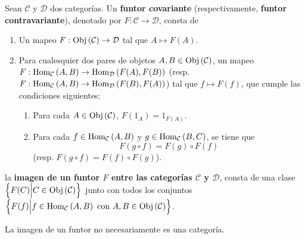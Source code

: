 \documentclass[12pt]{report}
\theoremstyle{largebreak}
\newcommand\cf[3]{\ensuremath{#1:#2\rightarrow#3}}
\newcommand{\Obj}[1]{\ensuremath{\textup{Obj}\left(#1\right)}}
\newcommand{\Hom}[3]{\ensuremath{\textup{Hom}_{#1}\left(#2,#3\right)}}
\begin{document}
    \begin{mydef}
        Sean $\mathcal{C}$ y $\mathcal{D}$ dos categorías. Un \textbf{funtor covariante} (respectivamente, \textbf{funtor contravariante}), denotado por $\cf{F}{\mathcal{C}}{\mathcal{D}}$, consta de
        \begin{enumerate}
            \item Un mapeo $\cf{F}{\Obj{\mathcal{C}}}{\mathcal{D}}$ tal que $A\mapsto F(A)$.
            \item Para cualesquier dos pares de objetos $A,B\in\Obj{\mathcal{C}}$, un mapeo $\cf{F}{\Hom{\mathcal{C}}{A}{B}}{\Hom{\mathcal{D}}{F(A)}{F(B)}}$ (resp. $\cf{F}{\Hom{\mathcal{C}}{A}{B}}{\Hom{\mathcal{D}}{F(B)}{F(A)}}$) tal que $f\mapsto F(f)$, que cumple las condiciones siguientes:
            \begin{enumerate}
                \item Para cada $A\in\Obj{\mathcal{C}}$, $F(1_A)=1_{F(A)}$.
                \item Para cada $f\in\Hom{\mathcal{C}}{A}{B}$ y $g\in\Hom{\mathcal{C}}{B}{C}$, se tiene que
                \begin{equation*}
                    F(g\circ f)=F(g)\circ F(f)
                \end{equation*}
                (resp. $F(g\circ f)=F(f)\circ F(g)$).
            \end{enumerate}
        \end{enumerate}
    \end{mydef}

    \begin{mydef}
        la \textbf{imagen de un funtor $F$ entre las categorías $\mathcal{C}$ y $\mathcal{D}$}, consta de una clase $\left\{F(C)\Big|C\in\Obj{\mathcal{C}} \right\}$ junto con todos los conjuntos $\left\{F(f)\Big|f\in\Hom{\mathcal{C}}{A}{B}\textup{ con }A,B\in\Obj{\mathcal{C}} \right\}$.
    \end{mydef}

    \begin{obs}
        La imagen de un funtor no necesariamente es una categoría.
    \end{obs}
\end{document}
